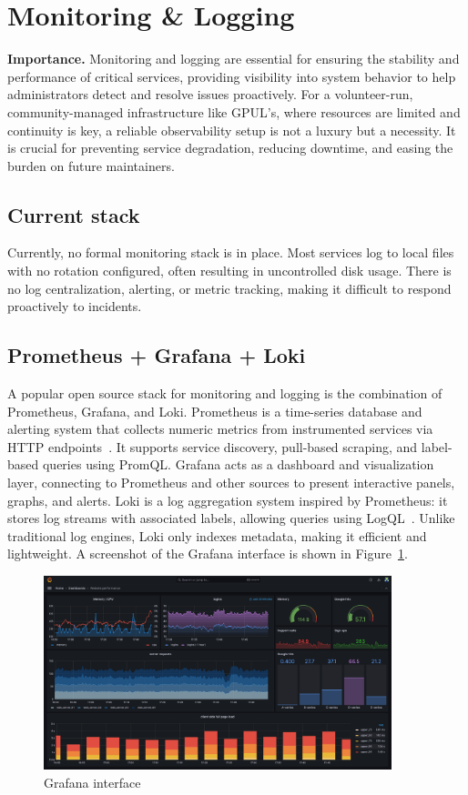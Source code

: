 \section{Monitoring \& Logging}

\textbf{Importance.} Monitoring and logging are essential for ensuring the stability and performance of critical services, providing visibility into system behavior to help administrators detect and resolve issues proactively. For a volunteer-run, community-managed infrastructure like GPUL's, where resources are limited and continuity is key, a reliable observability setup is not a luxury but a necessity. It is crucial for preventing service degradation, reducing downtime, and easing the burden on future maintainers.

\subsection*{Current stack}
Currently, no formal monitoring stack is in place. Most services log to local files with no rotation configured, often resulting in uncontrolled disk usage. There is no log centralization, alerting, or metric tracking, making it difficult to respond proactively to incidents.

\subsection*{Prometheus + Grafana + Loki}
A popular open source stack for monitoring and logging is the combination of Prometheus, Grafana, and Loki. Prometheus is a time-series database and alerting system that collects numeric metrics from instrumented services via HTTP endpoints~\cite{prometheus_docs}. It supports service discovery, pull-based scraping, and label-based queries using PromQL. Grafana acts as a dashboard and visualization layer, connecting to Prometheus and other sources to present interactive panels, graphs, and alerts. Loki is a log aggregation system inspired by Prometheus: it stores log streams with associated labels, allowing queries using LogQL~\cite{loki_docs}. Unlike traditional log engines, Loki only indexes metadata, making it efficient and lightweight. A screenshot of the Grafana interface is shown in Figure~\ref{fig:grafana-ui}.

\begin{figure}[H]
  \centering
  \includegraphics[width=0.9\textwidth]{imaxes/grafana-ui.png}
  \caption{Grafana interface}
  \label{fig:grafana-ui}
\end{figure}

